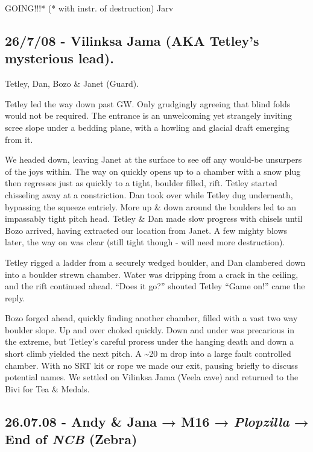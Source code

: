 GOING!!!* (* with instr. of destruction) Jarv

\hypertarget{vilinksa-jama-aka-tetleys-mysterious-lead.}{%
\subsection{26/7/08 - Vilinksa Jama (AKA Tetley's mysterious
lead).}\label{vilinksa-jama-aka-tetleys-mysterious-lead.}}

Tetley, Dan, Bozo \& Janet (Guard).

Tetley led the way down past GW. Only grudgingly agreeing that blind
folds would not be required. The entrance is an unwelcoming yet
strangely inviting scree slope under a bedding plane, with a howling and
glacial draft emerging from it.

We headed down, leaving Janet at the surface to see off any would-be
unsurpers of the joys within. The way on quickly opens up to a chamber
with a snow plug then regresses just as quickly to a tight, boulder
filled, rift. Tetley started chisseling away at a constriction. Dan took
over while Tetley dug underneath, bypassing the squeeze entriely. More
up \& down around the boulders led to an impassably tight pitch head.
Tetley \& Dan made slow progress with chisels until Bozo arrived, having
extracted our location from Janet. A few mighty blows later, the way on
was clear (still tight though - will need more destruction).

Tetley rigged a ladder from a securely wedged boulder, and Dan clambered
down into a boulder strewn chamber. Water was dripping from a crack in
the ceiling, and the rift continued ahead. ``Does it go?'' shouted
Tetley ``Game on!'' came the reply.

Bozo forged ahead, quickly finding another chamber, filled with a vast
two way boulder slope. Up and over choked quickly. Down and under was
precarious in the extreme, but Tetley's careful proress under the
hanging death and down a short climb yielded the next pitch. A
\textasciitilde{}20 m drop into a large fault controlled chamber. With
no SRT kit or rope we made our exit, pausing briefly to discuss
potential names. We settled on Vilinksa Jama (Veela cave) and returned
to the Bivi for Tea \& Medals. 

\hypertarget{andy-jana-m16-plopzilla-end-of-ncb-zebra}{%
\subsection{\texorpdfstring{26.07.08 - Andy \& Jana → M16 →
\emph{Plopzilla} → End of \emph{NCB}
(Zebra)}{26.07.08 - Andy \& Jana → M16 → Plopzilla → End of NCB (Zebra)}}\label{andy-jana-m16-plopzilla-end-of-ncb-zebra}}

